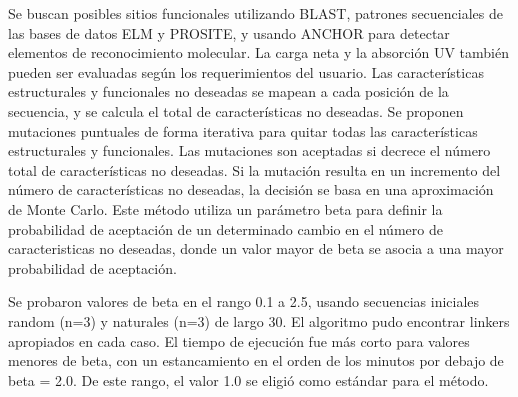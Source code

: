 Se buscan posibles sitios funcionales utilizando BLAST, patrones secuenciales de las bases de datos ELM y PROSITE, y usando ANCHOR para detectar elementos de reconocimiento molecular.
La carga neta y la absorción UV también pueden ser evaluadas según los requerimientos del usuario.
Las características estructurales y funcionales no deseadas se mapean a cada posición de la secuencia, y se calcula el total de características no deseadas.
Se proponen mutaciones puntuales de forma iterativa para quitar todas las características estructurales y funcionales.
Las mutaciones son aceptadas si decrece el número total de características no deseadas.
Si la mutación resulta en un incremento del número de características no deseadas, la decisión se basa en una aproximación de Monte Carlo.
Este método utiliza un parámetro beta para definir la probabilidad de aceptación de un determinado cambio en el número de caracteristicas no deseadas, 
donde un valor mayor de beta se asocia a una mayor probabilidad de aceptación.






Se probaron valores de beta en el rango 0.1 a 2.5, usando secuencias iniciales random (n=3) y naturales (n=3) de largo 30.
El algoritmo pudo encontrar linkers apropiados en cada caso. El tiempo de ejecución fue más corto para valores menores de beta,
con un estancamiento en el orden de los minutos por debajo de beta = 2.0.
De este rango, el valor 1.0 se eligió como estándar para el método.





